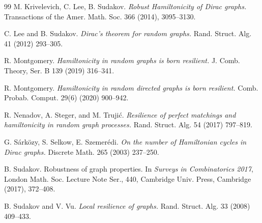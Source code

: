 \documentclass[a4paper,11pt]{article}
\theoremstyle{definition}
\begin{document}
\begin{thebibliography}{99}
M. Krivelevich, C. Lee, B. Sudakov. 
\emph{Robust Hamiltonicity of Dirac graphs.} 
Transactions of the Amer. Math. Soc. 366 (2014), 3095--3130.

C. Lee and B. Sudakov. 
\emph{Dirac’s theorem for random graphs.}
Rand. Struct. Alg. 41 (2012) 293--305.

R. Montgomery.
\emph{Hamiltonicity in random graphs is born resilient.} 
J. Comb. Theory, Ser. B 139 (2019) 316--341.

R. Montgomery. 
\emph{Hamiltonicity in random directed graphs is born resilient.}
Comb. Probab. Comput. 29(6) (2020) 900--942.

R. Nenadov, A. Steger, and M. Truji\'c.
\emph{Resilience of perfect matchings and hamiltonicity in random graph processes.}
Rand. Struct. Alg. 54 (2017) 797--819.

G. S\'ark\"ozy, S. Selkow, E. Szemer\'edi.
\emph{On the number of Hamiltonian cycles in Dirac graphs.}
Discrete Math. 265 (2003) 237--250.

 B. Sudakov. 
Robustness of graph properties.
In \emph{Surveys in Combinatorics 2017}, London Math. Soc. Lecture Note Ser., 440, Cambridge Univ. Press, Cambridge (2017), 372--408.

B. Sudakov and V. Vu. 
\emph{Local resilience of graphs.} 
Rand. Struct. Alg. 33 (2008) 409--433.

\end{thebibliography}
\end{document}
